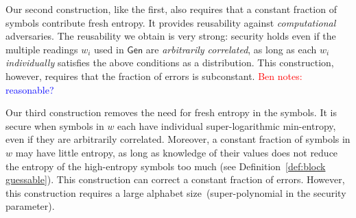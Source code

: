 \documentclass[11pt]{article}
\newcommand{\defref}[1]{\mbox{Definition~\ref{#1}}}
\newcommand{\consref}[1]{\mbox{Construction~\ref{#1}}}
\newcommand{\class}[1]{{\ensuremath{\mathsf{#1}}}}
\newcommand{\gen}{\ensuremath{\class{Gen}}\xspace}
\newcommand{\Huse}{\mathrm{H}_{\mathtt{usable}}}
\newcommand{\authnote}[2]{{\textcolor{red}{\textsf{#1 notes: }\textcolor{blue}{ #2}}\marginpar{\textcolor{red}{\textbf{!!!!!}}}}}
\newcommand{\authnote}[2]{}
\newcommand{\bnote}[1]{{\authnote{Ben}{#1}}}
\begin{document}
Our second construction, like the first, also requires that a constant fraction of symbols contribute fresh entropy. It provides reusability against \emph{computational} adversaries. 
The reusability we obtain is very strong:  security holds even if the multiple readings $w_i$ used in $\gen$ are \emph{arbitrarily correlated}, as long as each $w_i$ \emph{individually} satisfies the above conditions as a distribution. 
 This construction, however, requires that the fraction of errors is subconstant. \bnote{reasonable?}

Our third construction removes the need for fresh entropy in the symbols. 
It is secure when symbols in $w$
each have individual super-logarithmic min-entropy, even if they are arbitrarily correlated. Moreover,
a constant fraction of symbols in $w$ may have little entropy, as long as knowledge of their values does not reduce the entropy of the high-entropy symbols too much (see \defref{def:block guessable}).  This construction can correct a constant fraction of errors.  However, this construction requires a large alphabet size~(super-polynomial in the security parameter).

%
%
\end{document}
